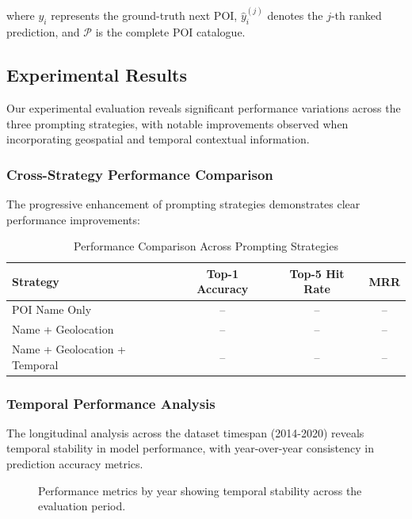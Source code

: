 \documentclass[12pt,a4paper]{article}
\begin{document}
where $y_i$ represents the ground-truth next POI, $\hat{y}_i^{(j)}$ denotes the $j$-th ranked prediction, and $\mathcal{P}$ is the complete POI catalogue.

\subsection{Experimental Results}

Our experimental evaluation reveals significant performance variations across the three prompting strategies, with notable improvements observed when incorporating geospatial and temporal contextual information.

\subsubsection{Cross-Strategy Performance Comparison}

The progressive enhancement of prompting strategies demonstrates clear performance improvements:

\begin{table}[h]
\centering
\caption{Performance Comparison Across Prompting Strategies}
\label{tab:strategy_comparison}
\begin{tabular}{lccc}
\toprule
\textbf{Strategy} & \textbf{Top-1 Accuracy} & \textbf{Top-5 Hit Rate} & \textbf{MRR} \\
\midrule
POI Name Only & -- & -- & -- \\
Name + Geolocation & -- & -- & -- \\
Name + Geolocation + Temporal & -- & -- & -- \\
\bottomrule
\end{tabular}
\end{table}

\subsubsection{Temporal Performance Analysis}

The longitudinal analysis across the dataset timespan (2014-2020) reveals temporal stability in model performance, with year-over-year consistency in prediction accuracy metrics.

\begin{figure}[h]
\centering
\caption{Performance metrics by year showing temporal stability across the evaluation period.}
\label{fig:temporal_performance}
\end{figure}
\end{document}
